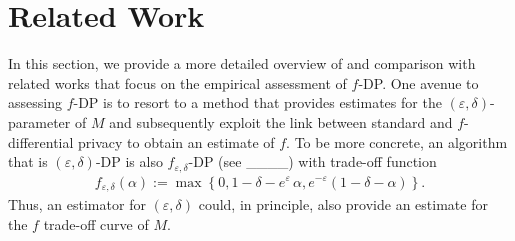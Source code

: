 \section{Related Work}
\label{sec:relatedwork}





In this section, we provide a more detailed overview of and comparison with related works that focus on the empirical assessment of $f$-DP. One avenue to assessing $f$-DP is to resort to a method that provides estimates for the $(\varepsilon,\delta)$-parameter of $M$ and subsequently exploit the link between standard and $f$-differential privacy to obtain an estimate of $f$. To be more concrete, an algorithm that is $(\varepsilon,\delta)$-DP is also $f_{\varepsilon, \delta}$-DP (see ____) with trade-off function 
\begin{align} \label{f_epsilon_delta}
    f_{\varepsilon, \delta}(\alpha) := \max \left\{ 0, 1 - \delta - e^{\varepsilon} \, \alpha, e^{- \varepsilon} (1 -\delta - \alpha) \right\}.
\end{align} 
Thus, an estimator for $(\varepsilon, \delta)$ could, in principle, also provide an estimate for the $f$ trade-off curve of $M$. 

